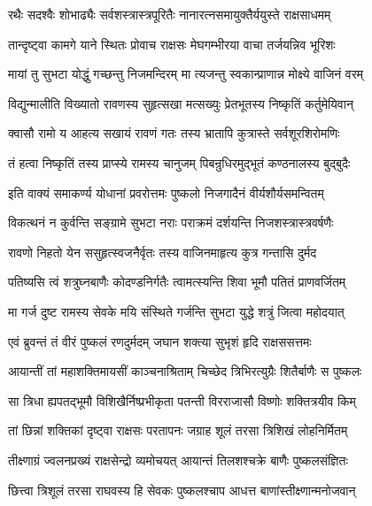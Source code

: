 \twolineshloka
{रथैः सदश्वैः शोभाढ्यैः सर्वशस्त्रास्त्रपूरितैः}
{नानारत्नसमायुक्तैर्ययुस्ते राक्षसाधमम्}%

\twolineshloka
{तान्दृष्ट्वा कामगे याने स्थितः प्रोवाच राक्षसः}
{मेघगम्भीरया वाचा तर्जयन्निव भूरिशः}%

\twolineshloka
{मायां तु सुभटा योद्धुं गच्छन्तु निजमन्दिरम्}
{मा त्यजन्तु स्वकान्प्राणान्न मोक्ष्ये वाजिनं वरम्}%

\twolineshloka
{विद्युन्मालीति विख्यातो रावणस्य सुहृत्सखा}
{मत्सख्युः प्रेतभूतस्य निष्कृतिं कर्तुमेयिवान्}%

\twolineshloka
{क्वासौ रामो य आहत्य सखायं रावणं गतः}
{तस्य भ्रातापि कुत्रास्ते सर्वशूरशिरोमणिः}%

\twolineshloka
{तं हत्वा निष्कृतिं तस्य प्राप्स्ये रामस्य चानुजम्}
{पिबन्रुधिरमुद्भूतं कण्ठनालस्य बुद्बुदैः}%

\twolineshloka
{इति वाक्यं समाकर्ण्य योधानां प्रवरोत्तमः}
{पुष्कलो निजगादैनं वीर्यशौर्यसमन्वितम्}%


\twolineshloka
{विकत्थनं न कुर्वन्ति सङ्ग्रामे सुभटा नराः}
{पराक्रमं दर्शयन्ति निजशस्त्रास्त्रवर्षणैः}%

\twolineshloka
{रावणो निहतो येन ससुहृत्स्वजनैर्वृतः}
{तस्य वाजिनमाहृत्य कुत्र गन्तासि दुर्मद}%

\twolineshloka
{पतिष्यसि त्वं शत्रुघ्नबाणैः कोदण्डनिर्गतैः}
{त्वामत्स्यन्ति शिवा भूमौ पतितं प्राणवर्जितम्}%

\twolineshloka
{मा गर्ज दुष्ट रामस्य सेवके मयि संस्थिते}
{गर्जन्ति सुभटा युद्धे शत्रुं जित्वा महोदयात्}%


\twolineshloka
{एवं ब्रुवन्तं तं वीरं पुष्कलं रणदुर्मदम्}
{जघान शक्त्या सुभृशं हृदि राक्षससत्तमः}%

\twolineshloka
{आयान्तीं तां महाशक्तिमायसीं काञ्चनाश्रिताम्}
{चिच्छेद त्रिभिरत्युग्रैः शितैर्बाणैः स पुष्कलः}%

\twolineshloka
{सा त्रिधा ह्यपतद्भूमौ विशिखैर्निष्प्रभीकृता}
{पतन्ती विरराजासौ विष्णोः शक्तित्रयीव किम्}%

\twolineshloka
{तां छिन्नां शक्तिकां दृष्ट्वा राक्षसः परतापनः}
{जग्राह शूलं तरसा त्रिशिखं लोहनिर्मितम्}%

\twolineshloka
{तीक्ष्णाग्रं ज्वलनप्रख्यं राक्षसेन्द्रो व्यमोचयत्}
{आयान्तं तिलशश्चक्रे बाणैः पुष्कलसंज्ञितः}%

\twolineshloka
{छित्त्वा त्रिशूलं तरसा राघवस्य हि सेवकः}
{पुष्कलश्चाप आधत्त बाणांस्तीक्ष्णान्मनोजवान्}%

